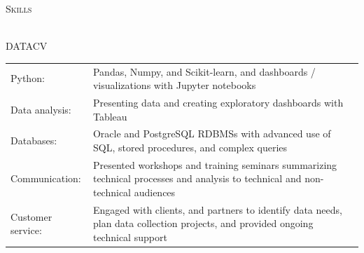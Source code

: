 \documentclass[letterpaper]{article}
\newcommand{\lineunder} {
        \vspace*{-8pt} \\
        \hspace*{-18pt} \hrulefill \\
    }
\newcommand{\header} [1] {
        {\hspace*{-18pt}\vspace*{6pt} \textsc{#1}}
        \vspace*{-6pt} \lineunder
        \vspace{1mm}
    }
\begin{document}
\header{Skills}
    \begin{taggedblock}{DATACV}
        \begin{tabular}[t]{ l L{5.17in} }
            Python: &
                Pandas, Numpy, and Scikit-learn, and dashboards / visualizations with
                Jupyter notebooks \\
            Data analysis: &                 
                Presenting data and creating exploratory dashboards with Tableau \\
            Databases: & 
                Oracle and PostgreSQL RDBMSs with advanced use of SQL, stored
                procedures, and complex queries \\
            Communication: &
                Presented workshops and training seminars summarizing technical
                processes and analysis to technical and non-technical audiences \\
            Customer service: &
                Engaged with clients, and partners to identify data needs, plan data
                collection projects, and provided ongoing technical support \\
        \end{tabular}
    \end{taggedblock}
\end{document}
